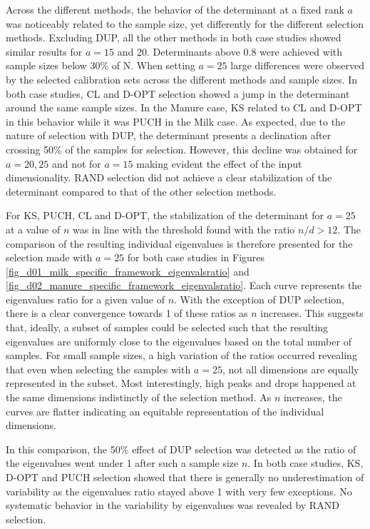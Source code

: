 \documentclass[journal=ancham,manuscript=article]{achemso}
\begin{document}
Across the different methods, the behavior of the determinant at a fixed rank $a$ was noticeably related to the sample size, yet differently for the different selection methods. Excluding DUP, all the other methods in both case studies showed similar results for $a=15$ and 20. Determinants above 0.8 were achieved with sample sizes below 30\% of N. When setting $a=25$ large differences were observed by the selected calibration sets across the different methods and sample sizes. In both case studies, CL and D-OPT selection showed a jump in the determinant around the same sample sizes. In the Manure case, KS related to CL and D-OPT in this behavior while it was PUCH in the Milk case. As expected, due to the nature of selection with DUP, the determinant presents a declination after crossing 50\% of the samples for selection. However, this decline was obtained for $a=20, 25$ and not for $a=15$ making evident the effect of the input dimensionality. RAND selection did not achieve a clear stabilization of the determinant compared to that of the other selection methods.   

For KS, PUCH, CL and D-OPT, the stabilization of the determinant for $a=25$ at a value of $n$ was in line with the threshold found with the ratio $n/d>12$. The comparison of the resulting individual eigenvalues is therefore presented for the selection made with $a = 25$ for both case studies in Figures \ref{fig_d01_milk_specific_framework_eigenvalsratio} and \ref{fig_d02_manure_specific_framework_eigenvalsratio}. Each curve represents the eigenvalues ratio for a given value of $n$. With the exception of DUP selection, there is a clear convergence towards 1 of these ratios as $n$ increases. This suggests that, ideally, a subset of samples could be selected such that the resulting eigenvalues are uniformly close to the eigenvalues based on the total number of samples. For small sample sizes, a high variation of the ratios occurred revealing that even when selecting the samples with $a=25$, not all dimensions are equally represented in the subset. Most interestingly, high peaks and drops happened at the same dimensions indistinctly of the selection method. As $n$ increases, the curves are flatter indicating an equitable representation of the individual dimensions. 

In this comparison, the 50\% effect of DUP selection was detected as the ratio of the eigenvalues went under 1 after such a sample size $n$. In both case studies, KS, D-OPT and PUCH selection showed that there is generally no underestimation of variability as the eigenvalues ratio stayed above 1 with very few exceptions. No systematic behavior in the variability by eigenvalues was revealed by RAND selection. 
\end{document}
